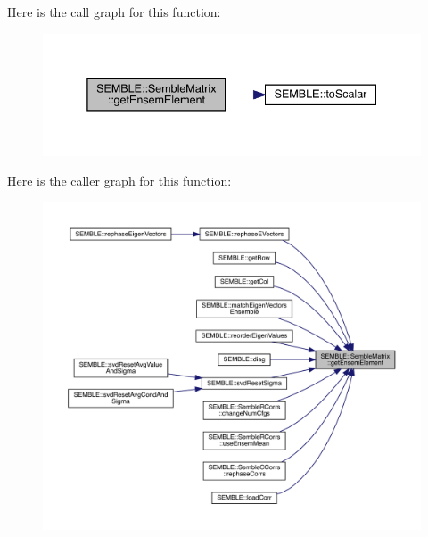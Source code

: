 Here is the call graph for this function\+:
\nopagebreak
\begin{figure}[H]
\begin{center}
\leavevmode
\includegraphics[width=338pt]{df/d87/structSEMBLE_1_1SembleMatrix_a31078e328f597a99646b6f12caa01418_cgraph}
\end{center}
\end{figure}
Here is the caller graph for this function\+:
\nopagebreak
\begin{figure}[H]
\begin{center}
\leavevmode
\includegraphics[width=350pt]{df/d87/structSEMBLE_1_1SembleMatrix_a31078e328f597a99646b6f12caa01418_icgraph}
\end{center}
\end{figure}
\mbox{\label{structSEMBLE_1_1SembleMatrix_a94e51c97855304a2fc8a59ef4ee8b109}} 
